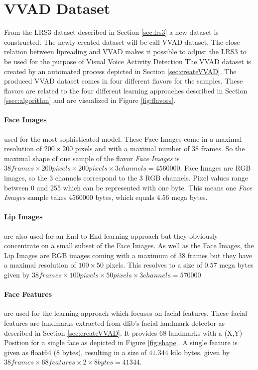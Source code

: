 \section{VVAD Dataset}\label{sec:vvadData}
From the LRS3 dataset described in Section \ref{sec:lrs3} a new dataset is constructed.
The newly created dataset will be call VVAD dataset.
The close relation between lipreading and VVAD makes it possible to adjust the LRS3 to be used for the purpose of Visual Voice Activity Detection
The VVAD dataset is created by an automated process depicted in Section \ref{sec:createVVAD}.
The produced VVAD dataset comes in four different flavors for the samples.
These flavors are related to the four different learning approaches described in Section \ref{ssec:algorithm} and are visualized in Figure \ref{fig:flavors}.
\paragraph{Face Images} used for the most sophisticated model.
These Face Images come in a maximal resolution of $200 \times 200$ pixels and with a maximal number of 38 frames.
So the maximal shape of one sample of the flavor \emph{Face Images} is $38 frames \times 200 pixels \times 200 pixels \times 3 channels = 4560000$.
Face Images are RGB images, so the 3 channels correspond to the 3 RGB channels.
Pixel values range between 0 and 255 which can be represented with one byte. 
This means one \emph{Face Images} sample takes 4560000 bytes, which equals $4.56$ mega bytes.
\paragraph{Lip Images} are also used for an End-to-End learning approach but they obviously concentrate on a small subset of the Face Images.
As well as the Face Images, the Lip Images are RGB images coming with a maximum of 38 frames but they have a maximal resolution of $100 \times 50$ pixels.
This resolves to a size of $0.57$ mega bytes given by $38 frames \times 100 pixels \times 50 pixels \times 3 channels = 570000$
\paragraph{Face Features} are used for the learning approach which focuses on facial features. 
These facial features are landmarks extracted from dlib's facial landmark detector 
as described in Section \ref{sec:createVVAD}.
It provides 68 landmarks with a (X,Y)-Position for a single face as depicted in Figure 
\ref{fig:shape}.
A single feature is given as float64 (8 bytes), resulting in a size of $41.344$ kilo bytes, given by $38 frames \times 68 features \times 2 \times 8 bytes = 41344$.
